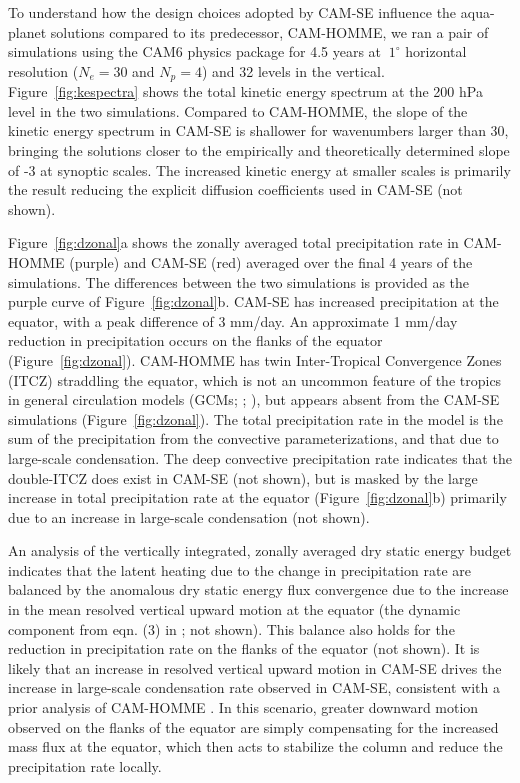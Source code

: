 \documentclass{agujournal}
\begin{document}
{To understand how the design choices adopted by CAM-SE influence the aqua-planet solutions compared to its predecessor, CAM-HOMME, we ran a pair of simulations using the CAM6 physics package for 4.5 years at $~1^\circ$ horizontal resolution ($N_e=30$ and $N_p=4$) and 32 levels in the vertical. Figure~\ref{fig:kespectra} shows the total kinetic energy spectrum at the 200 hPa level in the two simulations. Compared to CAM-HOMME, the slope of the kinetic energy spectrum in CAM-SE is shallower for wavenumbers larger than 30, bringing the solutions closer to the empirically \citep{NG1985JAS} and theoretically \citep{C1971JAS} determined slope of -3 at synoptic scales. The increased kinetic energy at smaller scales is primarily the result reducing the explicit diffusion coefficients used in CAM-SE (not shown).

 Figure~\ref{fig:dzonal}a shows the zonally averaged total precipitation rate in CAM-HOMME (purple) and CAM-SE (red) averaged over the final 4 years of the simulations. The differences between the two simulations is provided as the purple curve of Figure~\ref{fig:dzonal}b. CAM-SE has increased precipitation at the equator, with a peak difference of 3 mm/day. An approximate 1 mm/day reduction in precipitation occurs on the flanks of the equator (Figure~\ref{fig:dzonal}). CAM-HOMME has twin Inter-Tropical Convergence Zones (ITCZ) straddling the equator, which is not an uncommon feature of the tropics in general circulation models (GCMs; \cite{BGN2010JCLIM}; \cite{MWO2016JAMES}), but appears absent from the CAM-SE simulations (Figure~\ref{fig:dzonal}). The total precipitation rate in the model is the sum of the precipitation from the convective parameterizations, and that due to large-scale condensation. The deep convective precipitation rate indicates that the double-ITCZ does exist in CAM-SE (not shown), but is masked by the large increase in total precipitation rate at the equator (Figure~\ref{fig:dzonal}b) primarily due to an increase in large-scale condensation (not shown).

An analysis of the vertically integrated, zonally averaged dry static energy budget indicates that the latent heating due to the change in precipitation rate are balanced by the anomalous dry static energy flux convergence due to the increase in the mean resolved vertical upward motion at the equator (the dynamic component from eqn. (3) in \cite{MO2011NATUREC}; not shown). This balance also holds for the reduction in precipitation rate on the flanks of the equator (not shown). It is likely that an increase in resolved vertical upward motion in CAM-SE drives the increase in large-scale condensation rate observed in CAM-SE, consistent with a prior analysis of CAM-HOMME \citep{OETAL2016JAMES}. In this scenario, greater downward motion observed on the flanks of the equator are simply compensating for the increased mass flux at the equator, which then acts to stabilize the column and reduce the precipitation rate locally.

}
\end{document}
